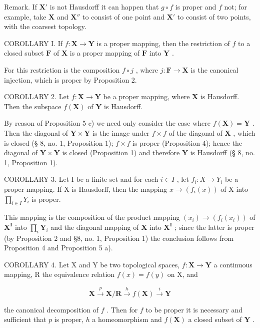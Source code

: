 Remark. If \(\mathbf{X}'\) is not Hausdorff it can happen that \(g \circ f\) is proper and \(f\) not; for example, take \(\mathbf{X}\) and \(\mathbf{X}''\) to consist of one point and \(\mathbf{X}'\) to consist of two points, with the coarsest topology.

COROLLARY I. If \(f: \mathbf{X} \to \mathbf{Y}\) is a proper mapping, then the restriction of \(f\) to a closed subset \(\mathbf{F}\) of \(\mathbf{X}\) is a proper mapping of \(\mathbf{F}\) into \(\mathbf{Y}\) .

For this restriction is the composition \(f \circ j\) , where \(j: \mathbf{F} \to \mathbf{X}\) is the canonical injection, which is proper by Proposition 2.

COROLLARY 2. Let \(f: \mathbf{X} \to \mathbf{Y}\) be a proper mapping, where \(\mathbf{X}\) is Hausdorff. Then the subspace \(f(\mathbf{X})\) of \(\mathbf{Y}\) is Hausdorff.

By reason of Proposition 5 c) we need only consider the case where \(f(\mathbf{X}) = \mathbf{Y}\) . Then the diagonal of \(\mathbf{Y} \times \mathbf{Y}\) is the image under \(f \times f\) of the diagonal of \(\mathbf{X}\) , which is closed (§ 8, no. 1, Proposition 1); \(f \times f\) is proper (Proposition 4); hence the diagonal of \(\mathbf{Y} \times \mathbf{Y}\) is closed (Proposition 1) and therefore \(\mathbf{Y}\) is Hausdorff (§ 8, no. 1, Proposition 1).

COROLLARY 3. Let I be a finite set and for each \(i \in I\) , let \(f_i: X \to Y_i\) be a proper mapping. If X is Hausdorff, then the mapping \(x \to (f_i(x))\) of X into \(\prod_{i \in I} Y_i\) is proper.

This mapping is the composition of the product mapping \((x_{i})\to (f_{i}(x_{i}))\) of \(\mathbf{X}^{\mathbf{I}}\) into \(\prod_{i}\mathbf{Y}_{i}\) and the diagonal mapping of \(\mathbf{X}\) into \(\mathbf{X}^{\mathbf{I}}\) ; since the latter is proper (by Proposition 2 and §8, no. 1, Proposition 1) the conclusion follows from Proposition 4 and Proposition 5 a).

COROLLARY 4. Let X and Y be two topological spaces, \(f: \mathbf{X} \to \mathbf{Y}\) a continuous mapping, R the equivalence relation \(f(x) = f(y)\) on X, and

\[
\mathbf {X} \xrightarrow {p} \mathbf {X} / \mathbf {R} \xrightarrow {h} f (\mathbf {X}) \xrightarrow {i} \mathbf {Y}
\]

the canonical decomposition of \(f\) . Then for \(f\) to be proper it is necessary and sufficient that \(p\) is proper, \(h\) a homeomorphism and \(f(\mathbf{X})\) a closed subset of \(\mathbf{Y}\) .

